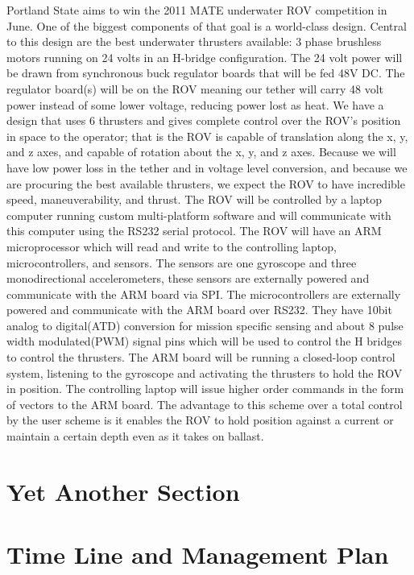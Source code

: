\documentclass{proposalnsf}
\begin{document}
Portland State aims to win the 2011 MATE underwater ROV competition in June. One of the biggest components of that goal is a world-class design. Central 
to this design are the best underwater thrusters available: 3 phase brushless motors running on 24 volts in an H-bridge configuration. The 24 volt power 
will be drawn from synchronous buck regulator boards that will be fed 48V DC. The regulator board(s) will be on the ROV meaning our tether will carry 48 
volt power instead of some lower voltage, reducing power lost as heat. We have a design that uses 6 thrusters and gives complete control over the ROV’s 
position in space to the operator; that is the ROV is capable of translation along the x, y, and z axes, and capable of rotation about the x, y, and z axes. 
Because we will have low power loss in the tether and in voltage level conversion, and because we are procuring the best available thrusters, we expect the 
ROV to have incredible speed, maneuverability, and thrust. The ROV will be controlled by a laptop computer running custom multi-platform software and will 
communicate with this computer using the RS232 serial protocol. The ROV will have an ARM microprocessor which will read and write to the controlling laptop, 
microcontrollers, and sensors. The sensors are one gyroscope and three monodirectional accelerometers, these sensors are externally powered and communicate 
with the ARM board via SPI. The microcontrollers are externally powered and communicate with the ARM board over RS232. They have 10bit analog to digital(ATD) 
conversion for mission specific sensing and about 8 pulse width modulated(PWM) signal pins which will be used to control the H bridges to control the thrusters. 
The ARM board will be running a closed-loop control system, listening to the gyroscope and activating the thrusters to hold the ROV in position. The 
controlling laptop will issue higher order commands in the form of vectors to the ARM board. The advantage to this scheme over a total control by the user 
scheme is it enables the ROV to hold position against a current or maintain a certain depth even as it takes on ballast.
\section{Yet Another Section}

\section{Time Line and Management Plan}
\end{document}

